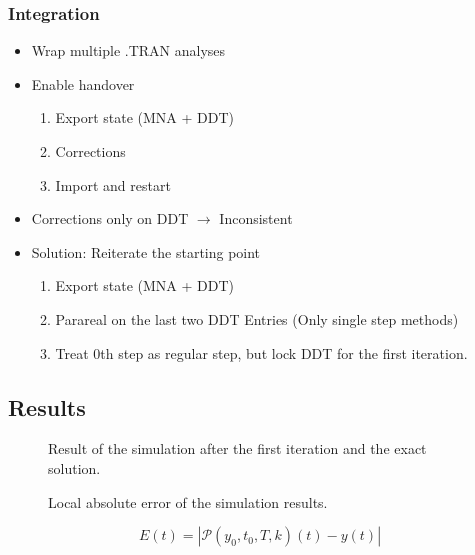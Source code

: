 \begin{frame}
    \frametitle{Integration}
    \begin{itemize}[<+->]
        \item Wrap multiple .TRAN analyses
        \item Enable handover
            \begin{enumerate}
                \item Export state (MNA + DDT)
                \item Corrections
                \item Import and restart
            \end{enumerate}
        \item Corrections only on DDT \(\rightarrow\) Inconsistent
        \item Solution: Reiterate the starting point
            \begin{enumerate}
                \item Export state (MNA + DDT)
                \item Parareal on the last two DDT Entries (Only single step methods)
                \item Treat 0th step as regular step, but lock DDT for the first iteration.
            \end{enumerate}
    \end{itemize}
    \end{frame}

\subsection{Results}

\begin{frame}
    \begin{figure}[ht]
        \centering
        \scalebox{0.8}{}
        \caption{Result of the simulation after the first iteration and the exact solution.}
        \label{fig:iters_log}
    \end{figure}
\end{frame}

\begin{frame}
    \begin{figure}[ht]
        \centering
        \scalebox{0.8}{}
        \caption{Local absolute error of the simulation results.}
        \label{fig:iters_log}
    \end{figure}
    \begin{equation*}
        E(t) = \left|\mathcal{P}(y_0,t_0,T,k)(t)-y(t)\right|
    \end{equation*}
\end{frame}

